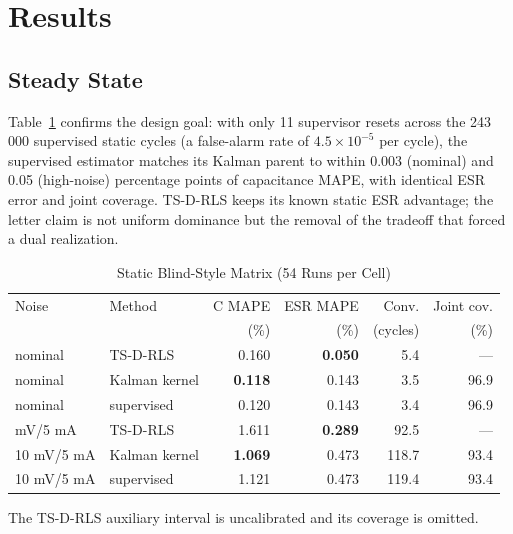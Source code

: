 \documentclass[journal]{IEEEtran}
\newcommand{\TSRLS}{TS-D-RLS}
\begin{document}
\section{Results}
\subsection{Steady State}
Table~\ref{tab:static} confirms the design goal: with only 11 supervisor
resets across the 243\,000 supervised static cycles (a false-alarm rate
of $4.5\times10^{-5}$ per cycle), the supervised estimator matches its
Kalman parent to within 0.003 (nominal) and 0.05 (high-noise) percentage
points of capacitance MAPE, with identical ESR error and joint coverage.
\TSRLS{} keeps its known static ESR advantage; the letter claim is not
uniform dominance but the removal of the tradeoff that forced a dual
realization.

\begin{table}[t]
\caption{Static Blind-Style Matrix (54 Runs per Cell)}
\label{tab:static}
\centering
\footnotesize
\setlength{\tabcolsep}{2.5pt}
\begin{tabular}{llrrrr}
\toprule
Noise & Method & C MAPE & ESR MAPE & Conv. & Joint cov. \\
 & & (\%) & (\%) & (cycles) & (\%) \\
\midrule
nominal & \TSRLS{} & 0.160 & \textbf{0.050} & 5.4 & --- \\
nominal & Kalman kernel & \textbf{0.118} & 0.143 & 3.5 & 96.9 \\
nominal & supervised & 0.120 & 0.143 & 3.4 & 96.9 \\
\addlinespace[2pt]
10 mV/5 mA & \TSRLS{} & 1.611 & \textbf{0.289} & 92.5 & --- \\
10 mV/5 mA & Kalman kernel & \textbf{1.069} & 0.473 & 118.7 & 93.4 \\
10 mV/5 mA & supervised & 1.121 & 0.473 & 119.4 & 93.4 \\
\bottomrule
\end{tabular}
\vspace{1mm}

\begin{minipage}{\columnwidth}
\scriptsize The \TSRLS{} auxiliary interval is uncalibrated
\cite{companion2026} and its coverage is omitted.
\end{minipage}
\end{table}
\end{document}
